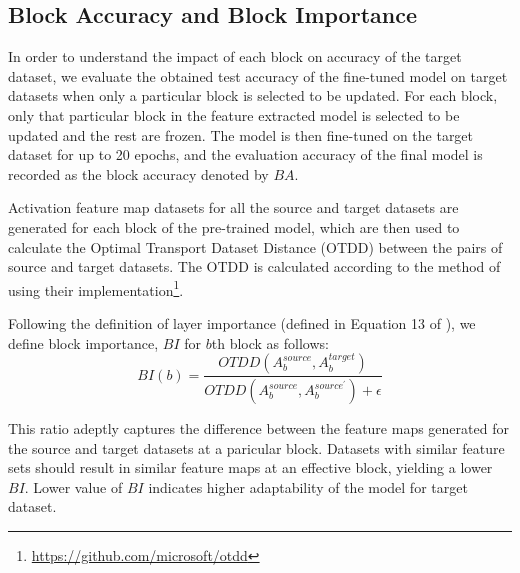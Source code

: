 \documentclass[a4paper,fleqn]{cas-sc}
\begin{document}
\subsection{Block Accuracy and Block Importance}
In order to understand the impact of each block on accuracy of the target dataset, we evaluate the obtained test accuracy of the fine-tuned model on target datasets when only a particular block is selected to be updated. For each block, only that particular block in the feature extracted model is selected to be updated and the rest are frozen. The model is then fine-tuned on the target dataset for up to 20 epochs, and the evaluation accuracy of the final model is recorded as the block accuracy denoted by $BA$.

Activation feature map datasets for all the source and target datasets are generated for each block of the pre-trained model, which are then used to calculate the Optimal Transport Dataset Distance (OTDD) between the pairs of source and target datasets.
The OTDD is calculated according to the method of \cite{DavidNicolo2020} using their implementation\footnote{\url{https://github.com/microsoft/otdd}}.


Following the definition of layer importance (defined in Equation 13 of \cite{Nagae2022}), we define block importance, $BI$ for $b$th block as follows:
\begin{equation}
\label{eq:23}
BI(b) = \frac{OTDD(A_b^{source}, A_b^{target})}{OTDD(A_b^{source}, A_b^{source^\prime}) + \epsilon}
\end{equation}

This ratio adeptly captures the difference between the feature maps generated for the source and target datasets at a paricular block. Datasets with similar feature sets should result in similar feature maps at an effective block, yielding a lower $BI$. Lower value of $BI$ indicates higher adaptability of the model for target dataset.

\end{document}
